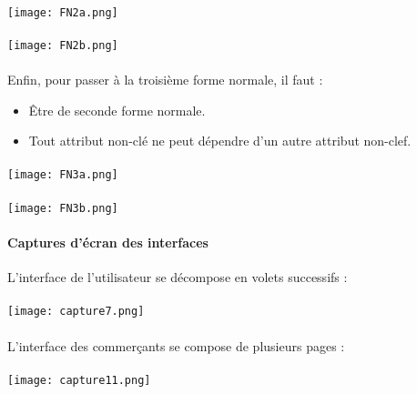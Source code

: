 \documentclass[a4paper,12pt,titlepage]{report}
\begin{document}
\paragraph*{}

\texttt{[image: FN2a.png]}

\paragraph*{}

\texttt{[image: FN2b.png]}

\newpage

\paragraph*{}

Enfin, pour passer à la troisième forme normale, il faut :
\begin{itemize}
\item Être de seconde forme normale.
\item Tout attribut non-clé ne peut dépendre d'un autre attribut non-clef.
\end{itemize}

\paragraph*{}

\texttt{[image: FN3a.png]}

\paragraph*{}

\texttt{[image: FN3b.png]}

\newpage

\paragraph*{Captures d'écran des interfaces}

L'interface de l'utilisateur se décompose en volets successifs :

\paragraph*{}

\texttt{[image: capture7.png]}

\newpage

\paragraph*{}

L'interface des commerçants se compose de plusieurs pages :

\paragraph*{}

\texttt{[image: capture11.png]}
\end{document}
